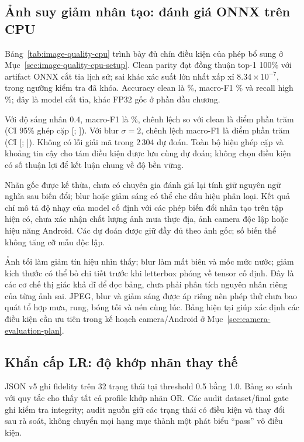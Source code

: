 \subsection{Ảnh suy giảm nhân tạo: đánh giá ONNX trên CPU}\label{sec:image-quality-cpu-results}
Bảng~\ref{tab:image-quality-cpu} trình bày đủ chín điều kiện của phép bổ sung ở Mục~\ref{sec:image-quality-cpu-setup}. Clean parity đạt đồng thuận top-1 100\% với artifact ONNX cắt tỉa lịch sử; sai khác xác suất lớn nhất xấp xỉ $8.34\times10^{-7}$, trong ngưỡng kiểm tra đã khóa. Accuracy clean là \QualityCleanAccuracy\%, macro-F1 \QualityCleanMacroFOne\% và recall high \QualityCleanHighRecall\%; đây là model cắt tỉa, khác FP32 gốc ở phần đầu chương.



Với độ sáng nhân $0.4$, macro-F1 là \QualityDarkMacroFOne\%, chênh lệch so với clean là \QualityDarkDeltaFOne{} điểm phần trăm (CI 95\% ghép cặp [\QualityDarkCILow; \QualityDarkCIHigh]). Với blur $\sigma=2$, chênh lệch macro-F1 là \QualityBlurDeltaFOne{} điểm phần trăm (CI [\QualityBlurCILow; \QualityBlurCIHigh]). Không có lỗi giải mã trong 2\,304 dự đoán. Toàn bộ hiệu ghép cặp và khoảng tin cậy cho tám điều kiện được lưu cùng dự đoán; không chọn điều kiện có số thuận lợi để kết luận chung về độ bền vững.

Nhãn gốc được kế thừa, chưa có chuyên gia đánh giá lại tính giữ nguyên ngữ nghĩa sau biến đổi; blur hoặc giảm sáng có thể che dấu hiệu phân loại. Kết quả chỉ mô tả độ nhạy của model cố định với các phép biến đổi nhân tạo trên tập hiện có, chưa xác nhận chất lượng ảnh mưa thực địa, ảnh camera độc lập hoặc hiệu năng Android. Các dự đoán được giữ đầy đủ theo ảnh gốc; số biến thể không tăng cỡ mẫu độc lập.

Ảnh tối làm giảm tín hiệu nhìn thấy; blur làm mất biên và mốc mức nước; giảm kích thước có thể bỏ chi tiết trước khi letterbox phóng về tensor cố định. Đây là các cơ chế thị giác khả dĩ để đọc bảng, chưa phải phân tích nguyên nhân riêng của từng ảnh sai. JPEG, blur và giảm sáng được áp riêng nên phép thử chưa bao quát tổ hợp mưa, rung, bóng tối và nén cùng lúc. Bảng hiện tại giúp xác định các điều kiện cần ưu tiên trong kế hoạch camera/Android ở Mục~\ref{sec:camera-evaluation-plan}.

\subsection{Khẩn cấp LR: độ khớp nhãn thay thế}
JSON v5 ghi fidelity trên 32 trạng thái tại threshold 0.5 bằng 1.0. Bảng so sánh với quy tắc cho thấy tất cả profile khớp nhãn OR. Các audit dataset/final gate ghi kiểm tra integrity; audit nguồn giữ các trạng thái có điều kiện và thay đổi sau rà soát, không chuyển mọi hạng mục thành một phát biểu ``pass'' vô điều kiện.

